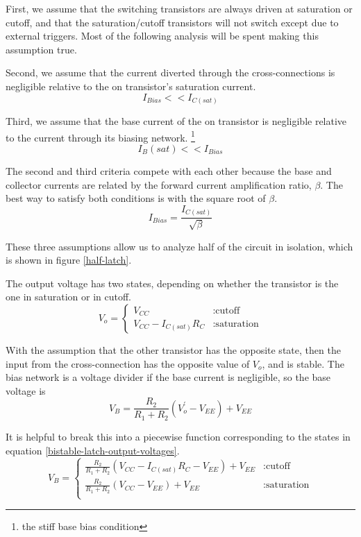 \documentclass[titlepage, letterpaper, 10.5pt]{article}
\begin{document}
First, we assume that the switching transistors are always driven at saturation or cutoff,
and that the saturation/cutoff transistors will not switch except due to external triggers.
Most of the following analysis will be spent making this assumption true.

Second, we assume that the current diverted through the cross-connections is negligible
relative to the on transistor's saturation current.
\begin{equation*}
I_{Bias}<<I_{C(sat)}
\end{equation*}

Third, we assume that the base current of the on transistor is negligible
relative to the current through its biasing network.
\footnote{the stiff base bias condition}
\begin{equation*}
I_B(sat)<<I_{Bias}
\end{equation*}

The second and third criteria compete with each other because the base and collector currents
are related by the forward current amplification ratio, $\beta$.
The best way to satisfy both conditions is with the square root of $\beta$.
\begin{equation}
I_{Bias}=\frac{I_{C(sat)}}{\sqrt{\beta}}
\end{equation}

These three assumptions allow us to analyze half of the circuit in isolation, which is shown
in figure \ref{half-latch}.

The output voltage has two states, depending on whether the transistor is the one in saturation
or in cutoff.
\begin{equation}
V_{o}=\left\{
	\begin{array}{lr}
	V_{CC}	& : \textrm{cutoff} \\
	V_{CC}-I_{C(sat)}R_{C}	& : \textrm{saturation}
	\end{array}
\right.
\label{bistable-latch-output-voltages}
\end{equation}

With the assumption that the other transistor has the opposite state, then the input from the
cross-connection has the opposite value of $V_{o}$, and is stable. The bias network is a voltage
divider if the base current is negligible, so the base voltage is
\begin{equation*}
V_{B}=\frac{R_{2}}{R_{1}+R_{2}}(V_{o}^{'}-V_{EE})+V_{EE}
\end{equation*}

It is helpful to break this into a piecewise function corresponding to the states in equation
\ref{bistable-latch-output-voltages}.
\begin{equation}
V_{B}=\left\{
	\begin{array}{lr}
	\frac{R_{2}}{R_{1}+R_{2}}(V_{CC}-I_{C(sat)}R_{C}-V_{EE})+V_{EE}	& : \textrm{cutoff}	\\
	\frac{R_{2}}{R_{1}+R_{2}}(V_{CC}-V_{EE})+V_{EE}	& : \textrm{saturation}	\\
	\end{array}
\right.
\label{latch-b-equations}
\end{equation}
\end{document}

